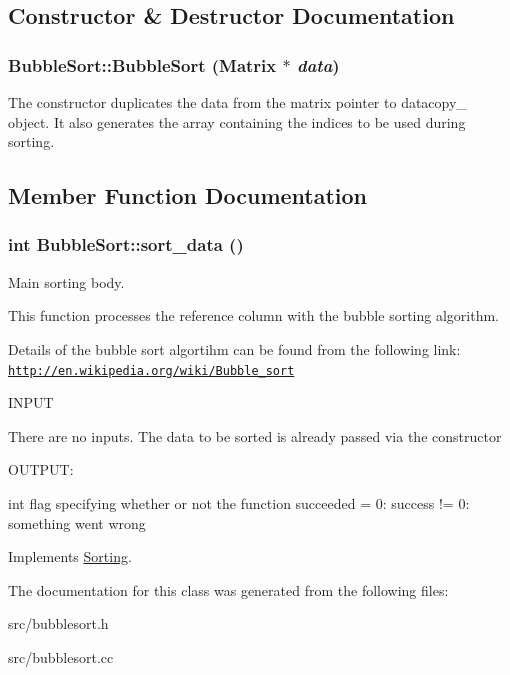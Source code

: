 \subsection{Constructor \& Destructor Documentation}
\hypertarget{classBubbleSort_a73599d7344bec5da6fb773c598500a60}{
\subsubsection[{BubbleSort}]{\setlength{\rightskip}{0pt plus 5cm}BubbleSort::BubbleSort ({\bf Matrix} $\ast$ {\em data})}}
\label{d9/d2a/classBubbleSort_a73599d7344bec5da6fb773c598500a60}
The constructor duplicates the data from the matrix pointer to datacopy\_\- object. It also generates the array containing the indices to be used during sorting. 

\subsection{Member Function Documentation}
\hypertarget{classBubbleSort_adec94eefc1117e7f302b303f5268c53a}{
\subsubsection[{sort\_\-data}]{\setlength{\rightskip}{0pt plus 5cm}int BubbleSort::sort\_\-data ()}}
\label{d9/d2a/classBubbleSort_adec94eefc1117e7f302b303f5268c53a}


Main sorting body. 

This function processes the reference column with the bubble sorting algorithm.

Details of the bubble sort algortihm can be found from the following link: \href{http://en.wikipedia.org/wiki/Bubble_sort}{\tt http://en.wikipedia.org/wiki/Bubble\_\-sort}

\begin{DoxyVerb}
  INPUT

  There are no inputs. The data to be sorted is already passed via the constructor

  OUTPUT:

  int         flag specifying whether or not the function succeeded
               = 0: success
	      != 0: something went wrong

  \end{DoxyVerb}
 

Implements \hyperlink{classSorting_a6686201265fbb31ba9c2071623742be1}{Sorting}.



The documentation for this class was generated from the following files:\begin{DoxyCompactItemize}
\item 
src/bubblesort.h\item 
src/bubblesort.cc\end{DoxyCompactItemize}
